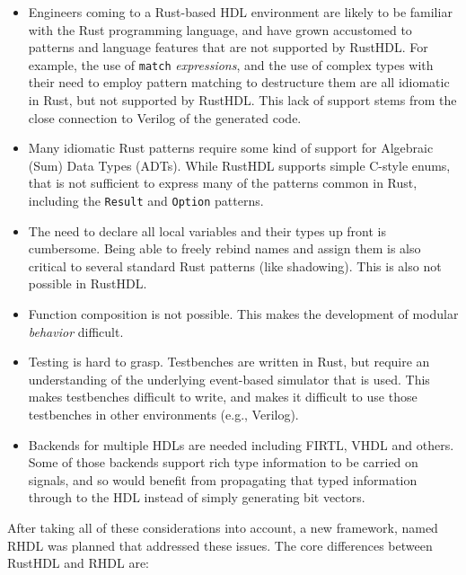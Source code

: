 \documentclass[conference]{IEEEtran}
\begin{document}
\begin{itemize}
  \item Engineers coming to a Rust-based HDL environment are likely to be familiar with the Rust programming language,
  and have grown accustomed to patterns and language features that are not supported by RustHDL.  For example, the 
  use of \verb|match| \emph{expressions}, and the use of complex types with their need to employ pattern matching to destructure 
  them are all idiomatic in Rust, but not supported by RustHDL.  This lack of support stems from the close 
  connection to Verilog of the generated code.
  \item Many idiomatic Rust patterns require some kind of support for Algebraic (Sum) Data Types (ADTs).  While RustHDL
  supports simple C-style enums, that is not sufficient to express many of the patterns common in Rust, including the 
  \verb|Result| and \verb|Option| patterns.
  \item The need to declare all local variables and their types up front is cumbersome.  Being able to freely rebind
  names and assign them is also critical to several standard Rust patterns (like shadowing).  This is also not
  possible in RustHDL.
  \item Function composition is not possible.  This makes the development of modular \emph{behavior} difficult.
  \item Testing is hard to grasp.  Testbenches are written in Rust, but require an understanding of the underlying
  event-based simulator that is used.  This makes testbenches difficult to write, and makes it difficult to use those
  testbenches in other environments (e.g., Verilog).
  \item Backends for multiple HDLs are needed including FIRTL, VHDL and others.  Some of those backends support
  rich type information to be carried on signals, and so would benefit from propagating that typed information through
  to the HDL instead of simply generating bit vectors.
\end{itemize}

After taking all of these considerations into account, a new framework, named RHDL was planned that addressed these issues.  The 
core differences between RustHDL and RHDL are:
\end{document}
